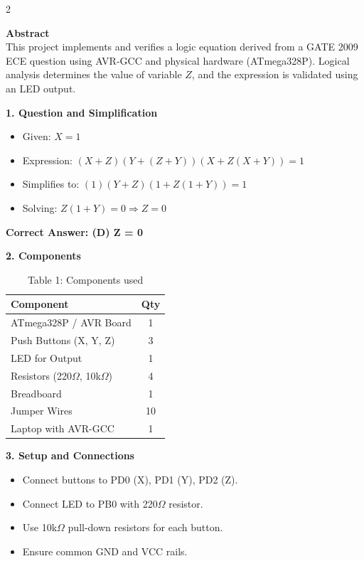 \documentclass[12pt]{article}
\begin{document}
\begin{multicols}{2}

\vspace{1em}
\noindent\textbf{Abstract} \\
This project implements and verifies a logic equation derived from a GATE 2009 ECE question using AVR-GCC and physical hardware (ATmega328P). Logical analysis determines the value of variable \(Z\), and the expression is validated using an LED output.

\vspace{1em}
\noindent\textbf{1. Question and Simplification}
\begin{itemize}
    \item Given: \( X = 1 \)
    \item Expression: \( (X + Z)(Y + (Z + Y))(X + Z(X + Y)) = 1 \)
    \item Simplifies to: \( (1)(Y + Z)(1 + Z(1 + Y)) = 1 \)
    \item Solving: \( Z(1 + Y) = 0 \Rightarrow Z = 0 \)
\end{itemize}
\textbf{Correct Answer: (D) Z = 0}

\vspace{1em}
\noindent\textbf{2. Components}
\begin{table}[H]
\small
\centering
\begin{tabular}{|p{4.2cm}|c|}
\hline
\textbf{Component} & \textbf{Qty} \\
\hline
ATmega328P / AVR Board & 1 \\
Push Buttons (X, Y, Z) & 3 \\
LED for Output & 1 \\
Resistors (220$\Omega$, 10k$\Omega$) & 4 \\
Breadboard & 1 \\
Jumper Wires & 10 \\
Laptop with AVR-GCC & 1 \\
\hline
\end{tabular}
\caption*{Table 1: Components used}
\end{table}

\vspace{1em}
\noindent\textbf{3. Setup and Connections}
\begin{itemize}
    \item Connect buttons to PD0 (X), PD1 (Y), PD2 (Z).
    \item Connect LED to PB0 with 220$\Omega$ resistor.
    \item Use 10k$\Omega$ pull-down resistors for each button.
    \item Ensure common GND and VCC rails.
\end{itemize}


\end{multicols}
\end{document}
